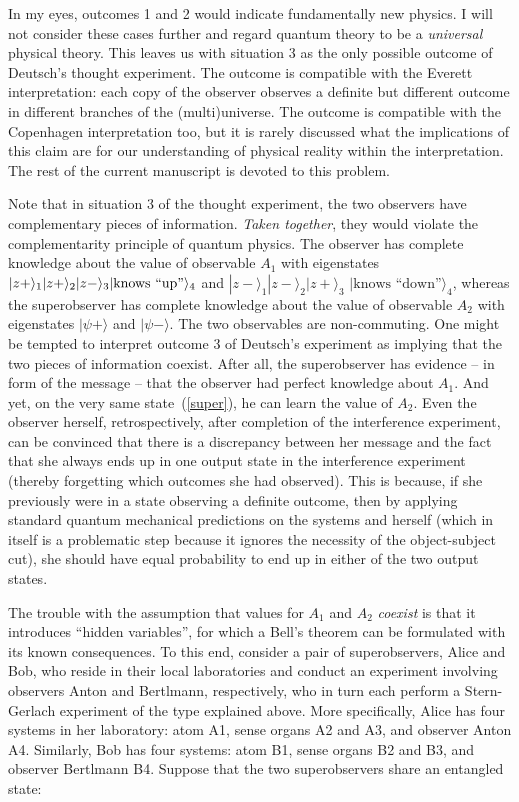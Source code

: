 \documentclass[12pt]{article}
\begin{document}
In my eyes, outcomes 1 and 2 would indicate fundamentally new physics. I will not consider these cases further and regard quantum theory to be a {\it universal} physical theory. This leaves us with situation 3 as the only possible outcome of Deutsch's thought experiment. The outcome is compatible with the Everett interpretation: each copy of the observer observes a definite but different outcome in different branches of the (multi)universe. The outcome is compatible with the Copenhagen interpretation too, but it is rarely discussed what the implications of this claim are for our understanding of physical reality within the interpretation. The rest of the current manuscript is devoted to this problem.   

Note that in situation 3 of the thought experiment, the two observers have complementary pieces of information. {\it Taken together}, they would violate the complementarity principle of quantum physics. The observer has complete knowledge about the value of observable $A_1$ with eigenstates $|z+\rangle_1|z+\rangle_2|z-\rangle_3| \break\mbox{knows ``up''} \rangle_4$ and $|z-\rangle_1|z-\rangle_2|z+\rangle_3 $ $ |\mbox{knows ``down''}\rangle_4$, whereas the superobserver has complete knowledge about the value of observable $A_2$ with eigenstates $|\psi+\rangle$ and $|\psi-\rangle$. The two observables are non-commuting. One might be tempted to interpret outcome 3 of Deutsch's experiment as implying that the two pieces of information coexist. After all, the superobserver has evidence -- in form of the message -- that the observer had perfect knowledge about $A_1$. And yet, on the very same state~(\ref{super}), he can learn the value of $A_2$. Even the observer herself, retrospectively, after completion of the interference experiment, can be convinced that there is a discrepancy between her message and the fact that she always ends up in one output state in the interference experiment (thereby forgetting which outcomes she had observed). This is because, if she previously were in a state observing a definite outcome, then by applying standard quantum mechanical predictions on the systems and herself (which in itself is a problematic step because it ignores the necessity of the object-subject cut), she should have equal probability to end up in either of the two output states. 

The trouble with the assumption that values for $A_1$ and $A_2$ {\it coexist} is that it introduces ``hidden variables'', for which a Bell's theorem can be formulated with its known consequences. To this end, consider a pair of superobservers, Alice and Bob, who reside in their local laboratories and conduct an experiment involving observers Anton and Bertlmann, respectively, who in turn each perform a Stern-Gerlach experiment of the type explained above. More specifically, Alice has four systems in her laboratory: atom A1, sense organs A2 and A3, and observer Anton A4. Similarly, Bob has four systems: atom B1, sense organs B2 and B3, and observer Bertlmann B4. Suppose that the two superobservers share an entangled state:
\end{document}
